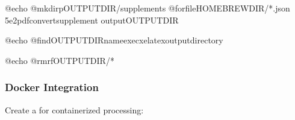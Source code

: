 \documentclass[letterpaper,10pt,english]{sphinxmanual}
\begin{document}
\begin{sphinxVerbatim}[commandchars=\\\{\}]
@echo
@mkdir\PYGZhy{}pOUTPUT\PYGZus{}DIR/supplements
@forfileHOMEBREW\PYGZus{}DIR/*.json
5e2pdfconvertsupplement
\PYGZhy{}\PYGZhy{}outputOUTPUT\PYGZus{}DIR

@echo
@findOUTPUT\PYGZus{}DIR\PYGZhy{}name\PYGZhy{}execxelatex\PYGZhy{}output\PYGZhy{}directory

@echo
@rm\PYGZhy{}rfOUTPUT\PYGZus{}DIR/*
\end{sphinxVerbatim}


\subsubsection{Docker Integration}
\label{\detokenize{user-guide/examples:docker-integration}}
\sphinxAtStartPar
Create a  for containerized processing:
\end{document}

